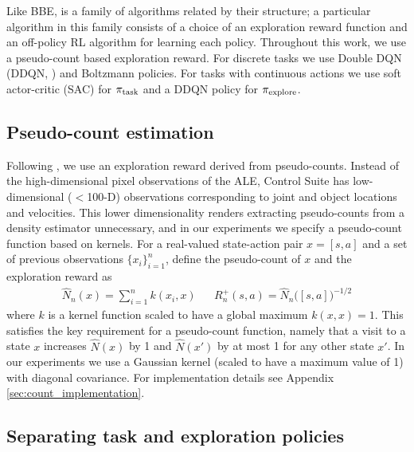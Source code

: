 Like BBE, \algshort{} is a family of algorithms related by their structure; a particular algorithm in this family consists of a choice of an exploration reward function and an off-policy RL algorithm for learning each policy.
Throughout this work, we use a pseudo-count based exploration reward.
For discrete tasks we use Double DQN (DDQN, \citet{Hasselt2016DeepRL}) and Boltzmann policies.
For tasks with continuous actions we use soft actor-critic (SAC) for $\pi_{\text{task}}$ and a DDQN policy for $\pi_{\text{explore}}$.


\subsection{Pseudo-count estimation} \label{sec:kernel_counts}
Following \citet{bellemare2016unifying}, we use an exploration reward derived from pseudo-counts.
Instead of the high-dimensional pixel observations of the ALE, Control Suite has low-dimensional ($<$100-D) observations corresponding to joint and object locations and velocities.
This lower dimensionality renders extracting pseudo-counts from a density estimator unnecessary, and in our experiments we specify a pseudo-count function based on kernels.
For a real-valued state-action pair $x = [s, a]$ and a set of previous observations $\{x_i\}_{i=1}^n$, define the pseudo-count of $x$ and the exploration reward as
\begin{align}
    \hat N_n(x) = \sum_{i=1}^n k(x_i, x) && R^+_n(s, a) = \hat N_n \big([s, a] \big)^{-1/2}
\end{align}
where $k$ is a kernel function scaled to have a global maximum $k(x, x) = 1$.
This satisfies the key requirement for a pseudo-count function, namely that a visit to a state $x$ increases $\hat N(x)$ by 1 and $\hat N(x')$ by at most 1 for any other state $x'$.
In our experiments we use a Gaussian kernel (scaled to have a maximum value of 1) with diagonal covariance.
For implementation details see Appendix \ref{sec:count_implementation}.

\subsection{Separating task and exploration policies}

